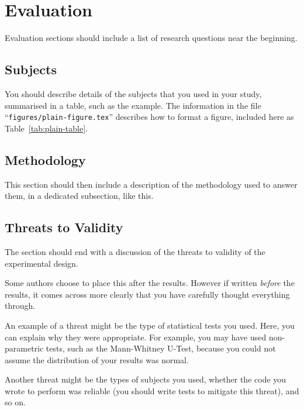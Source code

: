 \section{Evaluation}
\label{sec:evaluation}

Evaluation sections should include a list of
research questions near the beginning.


\subsection{Subjects}
\label{sec:subjects}

You should describe details of the subjects that 
you used in your study, summarised in a table,
such as the example. 
The information in the file 
``{\tt figures/plain-figure.tex}''
describes how to format a figure, included here as
Table~\ref{tab:plain-table}.



\subsection{Methodology}
\label{sec:methodology}

This section should then include a description of
the methodology used to answer them, in a dedicated
subsection, like this.



\subsection{Threats to Validity}
\label{sec:threats-to-validity}

The section should end with a discussion of the threats
to validity of the experimental design.

Some authors choose to place this after the results.
However if written {\em before} the results, it comes
across more clearly that you have carefully thought
everything through.

An example of a threat might be the type of 
statistical tests you used. Here, you can explain
why they were appropriate. For example, you may
have used non-parametric tests, such as the 
Mann-Whitney U-Test, because you could not assume
the distribution of your results was normal.

Another threat might be the types of subjects you
used, whether the code you wrote to perform was 
reliable (you should write tests to mitigate this
threat), and so on.
